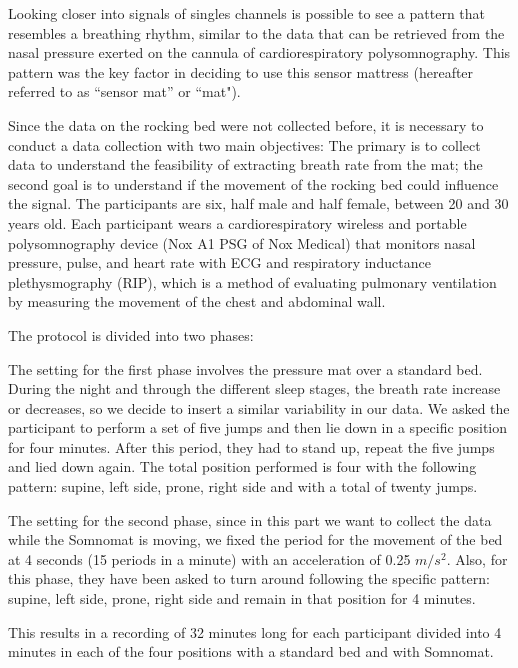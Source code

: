 Looking closer into signals of singles channels is possible to see a pattern that resembles a breathing rhythm, similar to the data that can be retrieved from the nasal pressure exerted on the cannula of cardiorespiratory polysomnography.
This pattern was the key factor in deciding to use this sensor mattress (hereafter referred to as ``sensor mat'' or ``mat"). 

Since the data on the rocking bed were not collected before, it is necessary to conduct a data collection with two main objectives:
The primary is to collect data to understand the feasibility of extracting breath rate from the mat; the second goal is to understand if the movement of the rocking bed could influence the signal.
The participants are six, half male and half female, between 20 and 30 years old.
Each participant wears a cardiorespiratory wireless and portable polysomnography device (Nox A1 PSG of Nox Medical\cite{WirelessSystem}) that monitors nasal pressure, pulse, and heart rate with ECG and respiratory inductance plethysmography (RIP), which is a method of evaluating pulmonary ventilation by measuring the movement of the chest and abdominal wall. 


The protocol is divided into two phases:

The setting for the first phase involves the pressure mat over a standard bed. During the night and through the different sleep stages, the breath rate increase or decreases, so we decide to insert a similar variability in our data. We asked the participant to perform a set of five jumps and then lie down in a specific position for four minutes. After this period, they had to stand up, repeat the five jumps and lied down again. The total position performed is four with the following pattern: supine, left side, prone, right side and with a total of twenty jumps.


The setting for the second phase, since in this part we want to collect the data while the Somnomat is moving, we fixed the period for the movement of the bed at 4 seconds (15 periods in a minute) with an acceleration of 0.25 $m/s^2$. Also, for this phase, they have been asked to turn around following the specific pattern: supine, left side, prone, right side and remain in that position for 4 minutes.

This results in a recording of 32 minutes long for each participant divided into 4 minutes in each of the four positions with a standard bed and with Somnomat.


